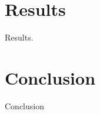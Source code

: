 \documentclass[12pt,a4paper]{article}
\begin{document}
\section{Results}
Results.

\section{Conclusion}
Conclusion

\newpage



\end{document}
